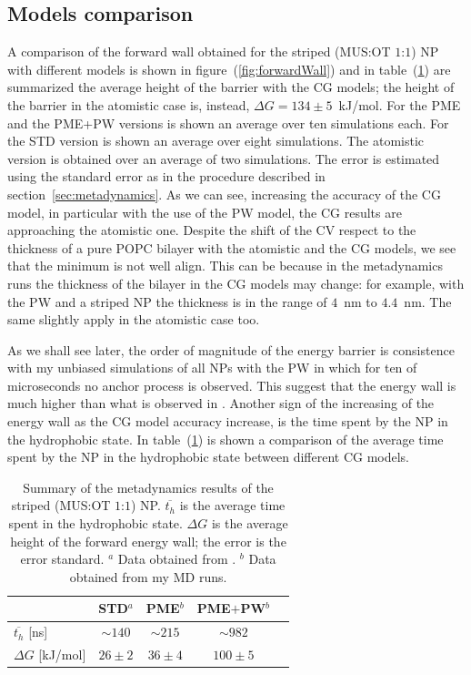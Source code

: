 \subsection{Models comparison}
A comparison of the forward wall obtained for the striped (\ac{MUS}:\ac{OT} $1$:$1$) \ac{NP} with different models is shown in figure~(\ref{fig:forwardWall}) and in table~(\ref{tab:hydroTime}) are summarized the average height of the barrier with the \ac{CG} models; the height of the barrier in the atomistic case is, instead, $\Delta G = 134 \pm 5$~kJ/mol. For the \ac{PME} and the \ac{PME}+\ac{PW} versions is shown an average over ten simulations each. For the STD version is shown an average over eight simulations. The atomistic version is obtained over an average of two simulations. The error is estimated using the standard error as in the procedure described in section~\ref{sec:metadynamics}. As we can see, increasing the accuracy of the \ac{CG} model, in particular with the use of the \ac{PW} model, the \ac{CG} results are approaching the atomistic one. Despite the shift of the \ac{CV} respect to the thickness of a pure \ac{POPC} bilayer with the atomistic and the \ac{CG} models, we see that the minimum is not well align. This can be because in the metadynamics runs the thickness of the bilayer in the \ac{CG} models may change: for example, with the \ac{PW} and a striped \ac{NP} the thickness is in the range of $4$~nm to $4.4$~nm. The same slightly apply in the atomistic case too.

As we shall see later, the order of magnitude of the energy barrier is consistence with my unbiased simulations of all \acp{NP} with the \ac{PW} in which for ten of microseconds no anchor process is observed. This suggest that the energy wall is much higher than what is observed in \cite{ourPaper}. Another sign of the increasing of the energy wall as the \ac{CG} model accuracy increase, is the time spent by the \ac{NP} in the hydrophobic state. In table~(\ref{tab:hydroTime}) is shown a comparison of the average time spent by the \ac{NP} in the hydrophobic state between different \ac{CG} models.
\begin{table}[h!t]
	\centering
	\begin{tabular}{lcccc}
		\toprule
		\,					& STD$^a$	& \acs{PME}$^b$	& \acs{PME}$+$\acs{PW}$^b$  \\ \toprule
	$\overline{t_{h}}$ [ns]	& $\sim 140$& $\sim 215$	& $\sim 982$			 	\\ \midrule
	$\Delta G$ [kJ/mol] 	& $26 \pm 2$& $36 \pm 4$	& $100 \pm 5$				\\ \bottomrule
	\end{tabular}
	\caption{Summary of the metadynamics results of the striped (\acs{MUS}:\acs{OT} $1$:$1$) \acs{NP}. $\overline{t_h}$ is the average time spent in the hydrophobic state. $\Delta G$ is the average height of the forward energy wall; the error is the error standard. \footnotesize $^a$ Data obtained from \cite{ourPaper}. $^b$ Data obtained from my \acs{MD} runs.}
	\label{tab:hydroTime}
\end{table}

